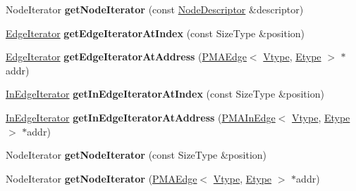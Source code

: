 \begin{DoxyCompactItemize}
\item 
\hypertarget{class_packed_memory_array_impl_a4a68e3b51d81312f9c496b12dddbf75b}{
NodeIterator {\bfseries getNodeIterator} (const \hyperlink{class_p_m_a_node}{NodeDescriptor} \&descriptor)}
\label{class_packed_memory_array_impl_a4a68e3b51d81312f9c496b12dddbf75b}

\item 
\hypertarget{class_packed_memory_array_impl_ab8eddc3878404002a185db79eefaff23}{
\hyperlink{class_packed_memory_array_1_1_iterator}{EdgeIterator} {\bfseries getEdgeIteratorAtIndex} (const SizeType \&position)}
\label{class_packed_memory_array_impl_ab8eddc3878404002a185db79eefaff23}

\item 
\hypertarget{class_packed_memory_array_impl_acc901ab81276e1a8fba469ae491b457f}{
\hyperlink{class_packed_memory_array_1_1_iterator}{EdgeIterator} {\bfseries getEdgeIteratorAtAddress} (\hyperlink{class_p_m_a_edge}{PMAEdge}$<$ \hyperlink{class_vtype}{Vtype}, \hyperlink{class_etype}{Etype} $>$ $\ast$addr)}
\label{class_packed_memory_array_impl_acc901ab81276e1a8fba469ae491b457f}

\item 
\hypertarget{class_packed_memory_array_impl_ae7fe105cd4c86ec1be64ac3a6434bff8}{
\hyperlink{class_packed_memory_array_1_1_iterator}{InEdgeIterator} {\bfseries getInEdgeIteratorAtIndex} (const SizeType \&position)}
\label{class_packed_memory_array_impl_ae7fe105cd4c86ec1be64ac3a6434bff8}

\item 
\hypertarget{class_packed_memory_array_impl_a458998bfab6ab300357b7a768fe36ffc}{
\hyperlink{class_packed_memory_array_1_1_iterator}{InEdgeIterator} {\bfseries getInEdgeIteratorAtAddress} (\hyperlink{class_p_m_a_in_edge}{PMAInEdge}$<$ \hyperlink{class_vtype}{Vtype}, \hyperlink{class_etype}{Etype} $>$ $\ast$addr)}
\label{class_packed_memory_array_impl_a458998bfab6ab300357b7a768fe36ffc}

\item 
\hypertarget{class_packed_memory_array_impl_a8a5db569449270ab60bdcb4f5063283b}{
NodeIterator {\bfseries getNodeIterator} (const SizeType \&position)}
\label{class_packed_memory_array_impl_a8a5db569449270ab60bdcb4f5063283b}

\item 
\hypertarget{class_packed_memory_array_impl_ac92bbcbc341d72f79d00166ee858ea3f}{
NodeIterator {\bfseries getNodeIterator} (\hyperlink{class_p_m_a_edge}{PMAEdge}$<$ \hyperlink{class_vtype}{Vtype}, \hyperlink{class_etype}{Etype} $>$ $\ast$addr)}
\label{class_packed_memory_array_impl_ac92bbcbc341d72f79d00166ee858ea3f}


\end{DoxyCompactItemize}
